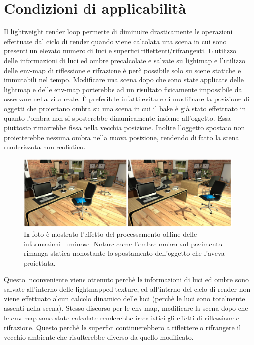 \section{Condizioni di applicabilità}
\label{sec:chapter_lrl_cond_app}

Il lightweight render loop permette di diminuire drasticamente le operazioni effettuate dal ciclo di render quando viene calcolata una scena in cui sono presenti un elevato numero di luci e superfici riflettenti/rifrangenti. 
L’utilizzo delle informazioni di luci ed ombre precalcolate e salvate su lightmap e l’utilizzo delle env-map di riflessione e rifrazione è però possibile solo su scene statiche e immutabili nel tempo.
Modificare una scena dopo che sono state applicate delle lightmap e delle env-map porterebbe ad un risultato fisicamente impossibile da osservare nella vita reale. 
È preferibile infatti evitare di modificare la posizione di oggetti che proiettano ombra su una scena in cui il bake è già stato effettuato in quanto l’ombra non si sposterebbe dinamicamente insieme all’oggetto. Essa piuttosto rimarrebbe fissa nella vecchia posizione. 
Inoltre l’oggetto spostato non proietterebbe nessuna ombra nella nuova posizione, rendendo di fatto la scena renderizzata non realistica. 
\\
\begin{figure}[htb]
 \centering
 \includegraphics[width=0.8\linewidth]{images/chapter_lrl/lrl_appl1.png}\hfill
 \caption[Applicabilità, ombre statiche]{In foto è mostrato l'effetto del processamento offline delle informazioni luminose. Notare come l'ombre ombra sul pavimento rimanga statica nonostante lo spostamento dell'oggetto che l'aveva proiettata.}
 \label{fig:lrl_appl1}
\end{figure}
Questo inconveniente viene ottenuto perchè le informazioni di luci ed ombre sono salvate all’interno delle lightmapped texture, ed all’interno del ciclo di render non viene effettuato alcun calcolo dinamico delle luci  (perchè le luci sono totalmente assenti nella scena).
Stesso discorso per le env-map, modificare la scena dopo che le env-map sono state calcolate renderebbe irrealistici gli effetti di riflessione e rifrazione. Questo perchè le superfici continuerebbero a riflettere o rifrangere  il vecchio ambiente che risulterebbe diverso da quello modificato.
